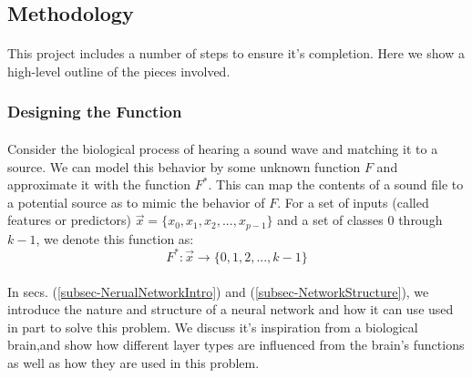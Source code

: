 \documentclass[12pt,letterpaper]{article}
\begin{document}

\newpage
\subsection{Methodology}
\label{sec-Methodology}

\paragraph*{}This project includes a number of steps to ensure it's completion. Here we show a high-level outline of the pieces involved.


\subsubsection{Designing the Function}

\paragraph*{}Consider the biological process of hearing a sound wave and matching it to a source. We can model this behavior by some unknown function $F$ and approximate it with the function $F^*$. This can map the contents of a sound file to a potential source as to mimic the behavior of $F$. For a set of inputs (called features or predictors) $\vec{x} = \big\{ x_0 , x_1 , x_2 , ... , x_{p-1} \big\}$ and a set of classes $0$ through $k-1$, we denote this function as:
\begin{equation}
\label{eqn-MappingFunction}
F^*: \vec{x} \rightarrow \big\{ 0 , 1 , 2 , ... , k-1 \big\}
\end{equation}

\paragraph*{}In secs. (\ref{subsec-NerualNetworkIntro}) and (\ref{subsec-NetworkStructure}), we introduce the nature and structure of a neural network and how it can use used in part to solve this problem. We discuss it's inspiration from a biological brain,and show how different layer types are influenced from the brain's functions as well as how they are used in this problem.

\end{document}
